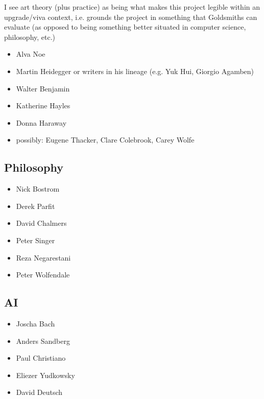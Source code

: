 \documentclass{article}
\begin{document}
I see art theory (plus practice) as being what makes this project legible within an upgrade/viva context, i.e. grounds the project in something that Goldsmiths can evaluate (as opposed to being something better situated in computer science, philosophy, etc.)

\begin{itemize}
\item Alva Noe
\item Martin Heidegger or writers in his lineage (e.g. Yuk Hui, Giorgio Agamben)
\item Walter Benjamin
\item Katherine Hayles
\item Donna Haraway
\item possibly: Eugene Thacker, Clare Colebrook, Carey Wolfe
\end{itemize}

\subsection{Philosophy}
\begin{itemize}
\item Nick Bostrom
\item Derek Parfit
\item David Chalmers
\item Peter Singer
\item Reza Negarestani
\item Peter Wolfendale
\end{itemize}

\subsection{AI}
\begin{itemize}
\item Joscha Bach
\item Anders Sandberg
\item Paul Christiano
\item Eliezer Yudkowsky
\item David Deutsch
\end{itemize}
\end{document}
